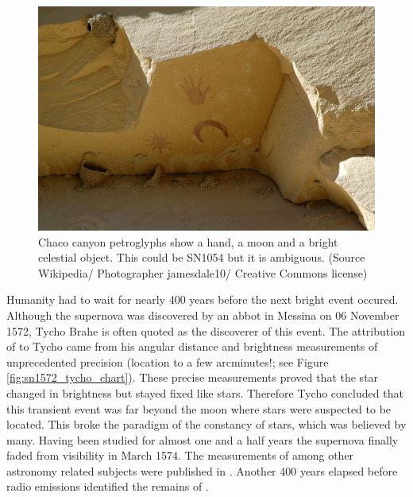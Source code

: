 \begin{figure}[htbp] %
   \centering
   \includegraphics[width=\textwidth]{chapter_intro/plots/Chaco_canyon_pueblo_bonito_petroglyphs.jpg} 
   \caption[Chaco canyon petroglyphs]{Chaco canyon petroglyphs show a hand, a moon and a bright celestial object. This could be SN1054 but it is ambiguous. (Source Wikipedia/ Photographer jamesdale10/ Creative Commons license)}
   \label{fig:sn1006_chaco}
\end{figure}

Humanity had to wait for nearly 400 years before the next bright event occured. Although the supernova was discovered by an abbot in Messina on 06 November 1572, Tycho Brahe is often quoted as the discoverer of this event. The attribution of  to Tycho came from his angular distance and brightness measurements of unprecedented precision (location to a few arcminutes!; see Figure \ref{fig:sn1572_tycho_chart}). These precise measurements proved that the star changed in brightness but stayed fixed like stars. Therefore Tycho concluded that this transient event was far beyond the moon where stars were suspected to be located. This broke the paradigm of the constancy of stars, which was believed by many. Having been studied for almost one and a half years the supernova finally faded from visibility in March 1574. The measurements of  among other astronomy related subjects were published in \cite{1602QB41.B73.......}. Another 400 years elapsed before radio emissions identified the remains of  \citep{1952Natur.170..364H}.


